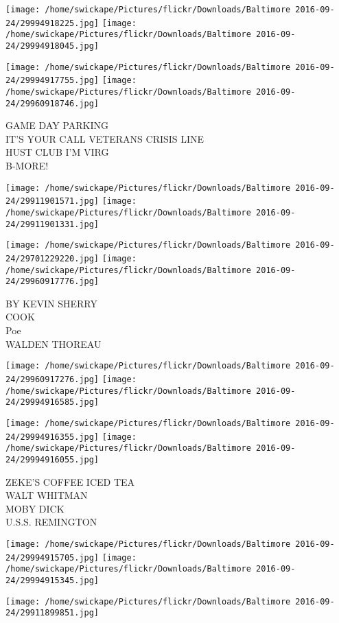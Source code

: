\documentclass[10pt,letterpaper]{article}
\begin{document}
\texttt{[image: /home/swickape/Pictures/flickr/Downloads/Baltimore 2016-09-24/29994918225.jpg]}
\texttt{[image: /home/swickape/Pictures/flickr/Downloads/Baltimore 2016-09-24/29994918045.jpg]}

\texttt{[image: /home/swickape/Pictures/flickr/Downloads/Baltimore 2016-09-24/29994917755.jpg]}
\texttt{[image: /home/swickape/Pictures/flickr/Downloads/Baltimore 2016-09-24/29960918746.jpg]}

GAME DAY PARKING\\
IT'S YOUR CALL VETERANS CRISIS LINE\\
HUST CLUB I'M VIRG\\
B{-}MORE!
\pagebreak

\texttt{[image: /home/swickape/Pictures/flickr/Downloads/Baltimore 2016-09-24/29911901571.jpg]}
\texttt{[image: /home/swickape/Pictures/flickr/Downloads/Baltimore 2016-09-24/29911901331.jpg]}

\texttt{[image: /home/swickape/Pictures/flickr/Downloads/Baltimore 2016-09-24/29701229220.jpg]}
\texttt{[image: /home/swickape/Pictures/flickr/Downloads/Baltimore 2016-09-24/29960917776.jpg]}

BY KEVIN SHERRY\\
COOK\\
Poe\\
WALDEN THOREAU
\pagebreak

\texttt{[image: /home/swickape/Pictures/flickr/Downloads/Baltimore 2016-09-24/29960917276.jpg]}
\texttt{[image: /home/swickape/Pictures/flickr/Downloads/Baltimore 2016-09-24/29994916585.jpg]}

\texttt{[image: /home/swickape/Pictures/flickr/Downloads/Baltimore 2016-09-24/29994916355.jpg]}
\texttt{[image: /home/swickape/Pictures/flickr/Downloads/Baltimore 2016-09-24/29994916055.jpg]}

ZEKE'S COFFEE ICED TEA\\
WALT WHITMAN\\
MOBY DICK\\
U.S.S. REMINGTON
\pagebreak

\texttt{[image: /home/swickape/Pictures/flickr/Downloads/Baltimore 2016-09-24/29994915705.jpg]}
\texttt{[image: /home/swickape/Pictures/flickr/Downloads/Baltimore 2016-09-24/29994915345.jpg]}

\texttt{[image: /home/swickape/Pictures/flickr/Downloads/Baltimore 2016-09-24/29911899851.jpg]}
\end{document}
